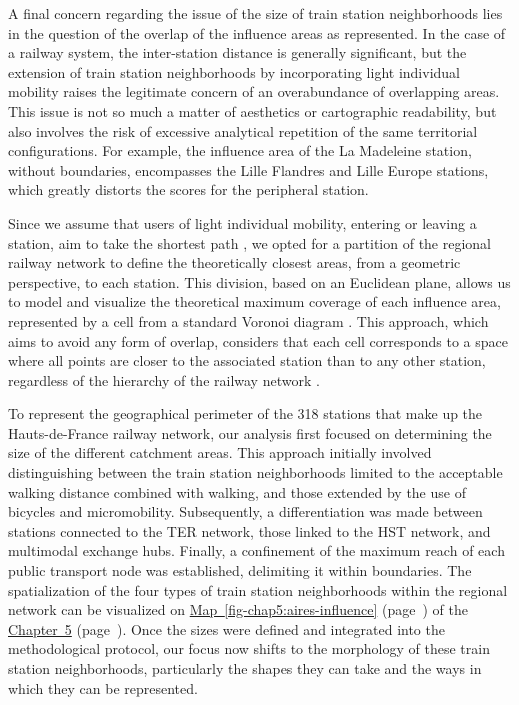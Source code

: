 \begin{refsegment}
A final concern regarding the issue of the size of train station neighborhoods lies in the question of the overlap of the influence areas as represented. In the case of a railway system, the inter-station distance is generally significant, but the extension of train station neighborhoods by incorporating light individual mobility raises the legitimate concern of an overabundance of overlapping areas. This issue is not so much a matter of aesthetics or cartographic readability, but also involves the risk of excessive analytical repetition of the same territorial configurations. For example, the  influence area of the La Madeleine station, without boundaries, encompasses the Lille Flandres and Lille Europe stations, which greatly distorts the scores for the peripheral station.%

Since we assume that users of light individual mobility, entering or leaving a station, aim to take the shortest path \textcolor{blue}{\autocite[116]{heran_distances_2009}}, we opted for a partition of the regional railway network to define the theoretically closest areas, from a geometric perspective, to each station. This division, based on an Euclidean plane, allows us to model and visualize the theoretical maximum coverage of each influence area, represented by a cell from a standard Voronoi diagram \textcolor{blue}{\autocite[479]{mota_method_2014}}. This approach, which aims to avoid any form of overlap, considers that each cell corresponds to a space where all points are closer to the associated station than to any other station, regardless of the hierarchy of the railway network \textcolor{blue}{\autocite[429]{lebedeva_increasing_2018}}.%

To represent the geographical perimeter of the 318 stations that make up the Hauts-de-France railway network, our analysis first focused on determining the size of the different catchment areas. This approach initially involved distinguishing between the train station neighborhoods limited to the acceptable walking distance combined with walking, and those extended by the use of bicycles and micromobility. Subsequently, a differentiation was made between stations connected to the \acrshort{TER} network, those linked to the \acrshort{HST} network, and multimodal exchange hubs. Finally, a confinement of the maximum reach of each public transport node was established, delimiting it within boundaries. The spatialization of the four types of train station neighborhoods within the regional network can be visualized on \hyperref[fig-chap5:aires-influence]{Map~\ref{fig-chap5:aires-influence}} (page~\pageref{fig-chap5:aires-influence}) of the \hyperref[chap5:titre]{Chapter~5} (page~\pageref{chap5:titre}). Once the sizes were defined and integrated into the methodological protocol, our focus now shifts to the morphology of these train station neighborhoods, particularly the shapes they can take and the ways in which they can be represented.%


\end{refsegment}
